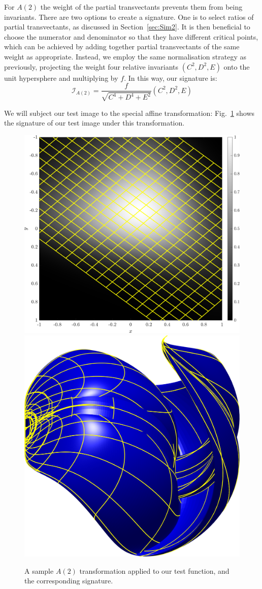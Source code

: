\documentclass[review,onefignum,onetabnum]{siamonline190516}
\begin{document}
For $A(2)$ the weight of the partial transvectants prevents them from being
invariants. There are two options to create a signature. One is to select
ratios of partial transvectants, as discussed in
Section~\ref{sec:Sim2}. It is then beneficial to choose the
numerator and denominator so that they have different critical points,
which can be achieved by adding together partial transvectants of the same
weight as appropriate. Instead, we employ the same normalisation strategy
as previously, projecting the weight four relative invariants $(C^2, D^2,
E)$ onto the unit hypersphere and multiplying by $f$. In this way, our
signature is:
\begin{equation}
    \label{eq:A2signature}
    \mathcal{I}_{A(2)} = \frac{f}{\sqrt{C^4 + D^4 + E^2}}(C^2, D^2, E)
\end{equation}

We will subject our test image to the special affine transformation:
Fig.~\ref{fig:A2} shows the signature of our test image under this transformation.
\begin{figure}
\centering
\includegraphics[width=.45\textwidth]{Figs/f_transformed_A2.png}
\includegraphics[width=.45\textwidth]{Figs/A2_signature.png}
\caption{A sample $A(2)$ transformation applied to our test function, and the corresponding signature.}
\label{fig:A2}
\end{figure}
\end{document}

